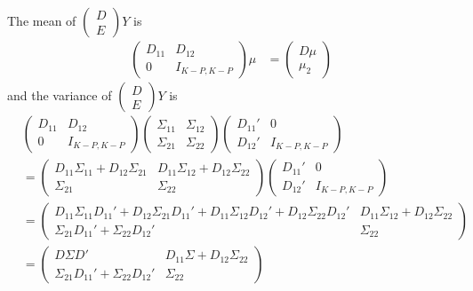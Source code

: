 \documentclass{article}[12pt]
\begin{document}
\begin{enumerate}
		The mean of $\begin{pmatrix} D \\ E \end{pmatrix} Y$ is
		\begin{align*}
			\begin{pmatrix} D_{11} & D_{12} \\ 0 & I_{K-P,K-P} \end{pmatrix} \mu &= \begin{pmatrix} D\mu \\ \mu_2 \end{pmatrix}
		\end{align*}
		and the variance of $\begin{pmatrix} D \\ E \end{pmatrix} Y$ is
		\begin{align*}
			&\begin{pmatrix} D_{11} & D_{12} \\ 0 & I_{K-P,K-P} \end{pmatrix}
				\begin{pmatrix} \Sigma_{11} & \Sigma_{12} \\ \Sigma_{21} & \Sigma_{22} \end{pmatrix}
				\begin{pmatrix} D_{11}' & 0 \\ D_{12}' & I_{K-P,K-P} \end{pmatrix} \\
			&= \begin{pmatrix} D_{11}\Sigma_{11} + D_{12}\Sigma_{21} & D_{11}\Sigma_{12} + D_{12}\Sigma_{22} \\ \Sigma_{21} & \Sigma_{22} \end{pmatrix}
				\begin{pmatrix} D_{11}' & 0 \\ D_{12}' & I_{K-P,K-P} \end{pmatrix} \\
			&= \begin{pmatrix} D_{11}\Sigma_{11}D_{11}' + D_{12}\Sigma_{21}D_{11}' + D_{11}\Sigma_{12}D_{12}' + D_{12}\Sigma_{22}D_{12}' & D_{11}\Sigma_{12} + D_{12}\Sigma_{22} \\
			\Sigma_{21}D_{11}' + \Sigma_{22}D_{12}' & \Sigma_{22} \end{pmatrix} \\
			&= \begin{pmatrix} D \Sigma D' & D_{11}\Sigma + D_{12}\Sigma_{22} \\ \Sigma_{21}D_{11}' + \Sigma_{22}D_{12}' & \Sigma_{22} \end{pmatrix}

\end{align*}
\end{enumerate}
\end{document}
